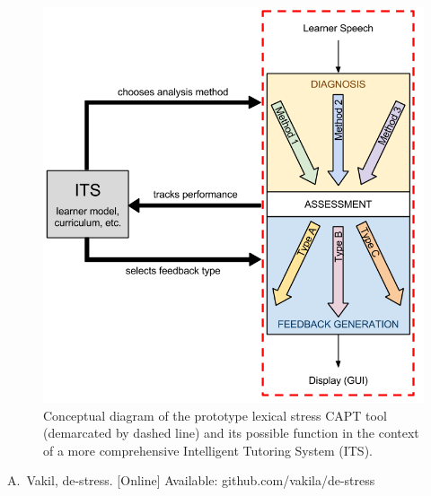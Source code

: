 \documentclass[a4paper]{article}
\newcommand{\TODO}[1]{{\color{red}\textbf{[TODO #1]}}}
\begin{document}
	\begin{figure}[!h] 
		\centering
		\includegraphics[height=.25\textheight]{../../img/hourglass-ITS} 
		\caption[Conceptual diagram of the prototype lexical stress CAPT tool]{Conceptual diagram of the prototype lexical stress CAPT tool (demarcated by dashed line) and its possible function in the context of a more comprehensive Intelligent Tutoring System (ITS).}
		\label{fig:hourglass-ITS}
	\end{figure}
	
%	
%	
%	
	
	


  \eightpt

  
  \begin{thebibliography}{1}
  A.\ Vakil, de-stress. [Online] Available: github.com/vakila/de-stress
  \end{thebibliography}
\end{document}
